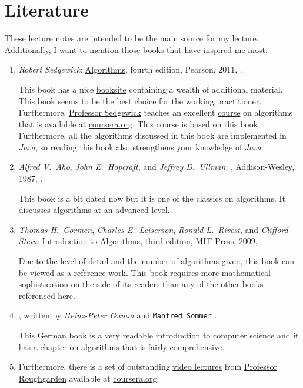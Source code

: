 \section{Literature}
These lecture notes are intended to be the main source for my lecture.  Additionally, I want
to mention those books that have inspired me most.
\begin{enumerate}
\item \textsl{Robert Sedgewick}: \href{https://www.amazon.com/Algorithms-4th-Robert-Sedgewick/dp/032157351X}{Algorithms}, 
      fourth edition, Pearson, 2011, \cite{sedgewick:11}.
    
      This book has a nice \href{http://algs4.cs.princeton.edu/home/}{booksite} containing a wealth
      of additional material.  This book seems to be the best choice for the working practitioner.
      Furthermore, \href{http://www.cs.princeton.edu/~rs/}{Professor Sedgewick} teaches an excellent 
      \href{https://www.coursera.org/course/algs4partI}{course} on algorithms that is available at
      \href{https://www.coursera.org/}{coursera.org}.  This course is based on this book.  Furthermore, all
      the algorithms discussed in this book are implemented in \textsl{Java}, so reading this book
      also strengthens your knowledge of \textsl{Java}.
\item \textsl{Alfred V.~Aho}, \textsl{John E.~Hopcraft}, and \textsl{Jeffrey D.~Ullman}:
      , Addison-Wesley, 1987, \cite{aho:87}.
      
      This book is a bit dated now but it is one of the classics on algorithms.  It discusses algorithms at an
      advanced level.
\item \textsl{Thomas H.~Cormen}, \textsl{Charles E.~Leiserson}, 
      \textsl{Ronald L.~Rivest}, and \textsl{Clifford Stein}:
      \href{https://www.amazon.com/Introduction-Algorithms-3rd-MIT-Press/dp/0262033844}{Introduction to Algorithms}, 
      third edition, MIT Press, 2009, \cite{cormen:09}

      Due to the level of detail and the number of algorithms given, this
      \href{https://en.wikipedia.org/wiki/Introduction_to_Algorithms}{book} can be viewed as a reference work. 
      This book requires more mathematical sophistication on the side of its readers than any of the
      other books referenced here.  
\item {},
      written by \textsl{Heinz-Peter Gumm} and \texttt{Manfred Sommer} \cite{gumm:2013}.
      
      This German book is a very readable introduction to computer science and it has a chapter
      on algorithms that is fairly comprehensive.  
\item Furthermore, there is a set of outstanding 
      \href{https://class.coursera.org/algo-004/class/index}{video lectures} 
      from \href{http://theory.stanford.edu/~tim/}{Professor Roughgarden}
      available at \href{https://www.coursera.org/}{coursera.org}.
\end{enumerate}


